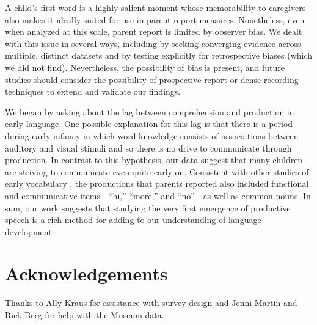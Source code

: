\documentclass[10pt,letterpaper]{article}
\begin{document}
A child's first word is a highly salient moment whose memorability to caregivers also makes it ideally suited for use in parent-report measures. Nonetheless, even when analyzed at this scale, parent report is limited by observer bias. We dealt with this issue in several ways, including by seeking converging evidence across multiple, distinct datasets and by testing explicitly for retrospective biases (which we did not find). Nevertheless, the possibility of bias is present, and future studies should consider the possibility of prospective report or dense recording techniques to extend and validate our findings. 

We began by asking about the lag between comprehension and production in early language. One possible explanation for this lag is that there is a period during early infancy in which word knowledge consists of associations between auditory and visual stimuli and so there is no drive to communicate through production. In contrast to this hypothesis, our data suggest that many children are striving to communicate even quite early on. Consistent with other studies of early vocabulary \cite{tardif2007}, the productions that parents reported also included functional and communicative items---``hi,'' ``more,'' and ``no''---as well as common nouns. In sum, our work suggests that studying the very first emergence of productive speech is a rich method for adding to our understanding of language development.

\section{Acknowledgements}

Thanks to Ally Kraus for assistance with survey design and Jenni Martin and Rick Berg for help with the Museum data.



\setlength{\bibleftmargin}{.125in}
\setlength{\bibindent}{-\bibleftmargin}


\end{document}
